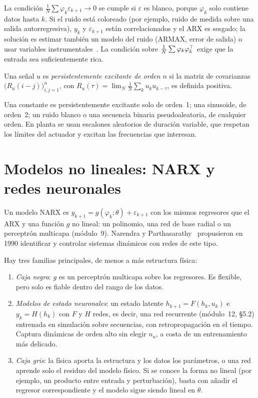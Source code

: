 La condición $\frac1N\sum\varphi_k\varepsilon_{k+1}\to0$ se cumple si $\varepsilon$ es blanco, porque $\varphi_k$ solo contiene datos hasta $k$. Si el ruido está coloreado (por ejemplo, ruido de medida sobre una salida autorregresiva), $y_k$ y $\varepsilon_{k+1}$ están correlacionados y el ARX es sesgado; la solución es estimar también un modelo del ruido (ARMAX, error de salida) o usar variables instrumentales~\cite{ljung}. La condición sobre $\frac1N\sum\varphi_k\varphi_k^{\top}$ exige que la entrada sea suficientemente rica.

\begin{definicion}\label{def:pe}
Una señal $u$ es \emph{persistentemente excitante de orden $n$} si la matriz de covarianzas $\bigl(R_u(i-j)\bigr)_{i,j=1}^{n}$, con $R_u(\tau)=\lim_N\frac1N\sum_ku_ku_{k-\tau}$, es definida positiva.
\end{definicion}

Una constante es persistentemente excitante solo de orden~1; una sinusoide, de orden~2; un ruido blanco o una secuencia binaria pseudoaleatoria, de cualquier orden. En planta se usan escalones aleatorios de duración variable, que respetan los límites del actuador y excitan las frecuencias que interesan.

\addtocounter{definicion}{1}%

\section{Modelos no lineales: NARX y redes neuronales}

\begin{definicion}\label{def:narx}
Un modelo NARX es $y_{k+1}=g(\varphi_k;\theta)+\varepsilon_{k+1}$ con los mismos regresores que el ARX y una función $g$ no lineal: un polinomio, una red de base radial o un perceptrón multicapa (módulo~9). Narendra y Parthasarathy~\cite{narendra} propusieron en 1990 identificar y controlar sistemas dinámicos con redes de este tipo.
\end{definicion}

Hay tres familias principales, de menos a más estructura física:
\begin{enumerate}
  \item \emph{Caja negra}: $g$ es un perceptrón multicapa sobre los regresores. Es flexible, pero solo es fiable dentro del rango de los datos.
  \item \emph{Modelos de estado neuronales}: un estado latente $h_{k+1}=F(h_k,u_k)$ e $y_k=H(h_k)$ con $F$ y $H$ redes, es decir, una red recurrente (módulo~12, §5.2) entrenada en simulación sobre secuencias, con retropropagación en el tiempo. Captura dinámicas de orden alto sin elegir $n_a$, a costa de un entrenamiento más delicado.
  \item \emph{Caja gris}: la física aporta la estructura y los datos los parámetros, o una red aprende solo el residuo del modelo físico. Si se conoce la forma no lineal (por ejemplo, un producto entre entrada y perturbación), basta con añadir el regresor correspondiente y el modelo sigue siendo lineal en $\theta$.
\end{enumerate}

